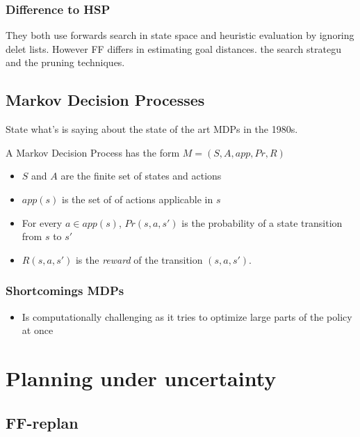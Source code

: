 \documentclass[runningheads,a4paper]{llncs}
\begin{document}
\subsubsection{Difference to HSP}
They both use forwards search in state space and heuristic evaluation by ignoring delet lists. However FF differs in estimating goal distances. the search strategu and the pruning techniques. 


\subsection{Markov Decision Processes}

State what's \cite{monahan1982state} is saying about the state of the art MDPs
in the 1980s.

\noindent A Markov Decision Process has the form $M = (S, A, app, Pr, R)$

\begin{itemize}
	\item $S$ and $A$ are the finite set of states and actions
	\item $app(s)$ is the set of of actions applicable in $s$
	\item For every $a \in app(s)$, $Pr(s,a,s')$ is the probability of a state
		transition from $s$ to $s'$
	\item $R(s,a,s')$ is the \emph{reward} of the transition $(s,a,s')$.
\end{itemize}

\subsubsection{Shortcomings MDPs}
\begin{itemize}
	\item Is computationally challenging as it tries to optimize large parts of the policy at once
\end{itemize}

\section{Planning under uncertainty}

\subsection{FF-replan \cite{FFReplan}}
\end{document}
